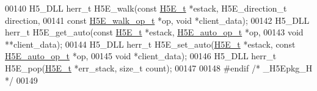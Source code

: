 \begin{DoxyCode}
00140 H5\_DLL herr\_t H5E\_walk(\textcolor{keyword}{const} \hyperlink{struct_h5_e__t}{H5E\_t} *estack, H5E\_direction\_t direction,
00141     \textcolor{keyword}{const} \hyperlink{struct_h5_e__walk__op__t}{H5E\_walk\_op\_t} *op, \textcolor{keywordtype}{void} *client\_data);
00142 H5\_DLL herr\_t H5E\_get\_auto(\textcolor{keyword}{const} \hyperlink{struct_h5_e__t}{H5E\_t} *estack, \hyperlink{struct_h5_e__auto__op__t}{H5E\_auto\_op\_t} *op,
00143     \textcolor{keywordtype}{void} **client\_data);
00144 H5\_DLL herr\_t H5E\_set\_auto(\hyperlink{struct_h5_e__t}{H5E\_t} *estack, \textcolor{keyword}{const} \hyperlink{struct_h5_e__auto__op__t}{H5E\_auto\_op\_t} *op,
00145     \textcolor{keywordtype}{void} *client\_data);
00146 H5\_DLL herr\_t H5E\_pop(\hyperlink{struct_h5_e__t}{H5E\_t} *err\_stack, \textcolor{keywordtype}{size\_t} count);
00147 
00148 \textcolor{preprocessor}{#endif }\textcolor{comment}{/* \_H5Epkg\_H */}\textcolor{preprocessor}{}
00149 
\end{DoxyCode}
